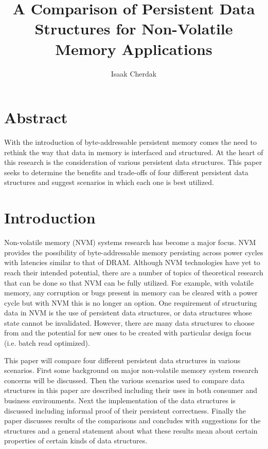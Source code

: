 \documentclass{article}
\title{A Comparison of Persistent Data Structures for Non-Volatile Memory
Applications}
\author{Isaak Cherdak}
\begin{document}
\maketitle

\section*{Abstract}

With the introduction of byte-addressable persistent memory comes the need to
rethink the way that data in memory is interfaced and structured. At the heart
of this research is the consideration of various persistent data structures.
This paper seeks to determine the benefits and trade-offs of four different
persistent data structures and suggest scenarios in which each one is best
utilized.

\pagebreak

\tableofcontents

\pagebreak


\section{Introduction}

Non-volatile memory (NVM) systems research has become a major focus. NVM
provides the possibility of byte-addressable memory persisting across power
cycles with latencies similar to that of DRAM. Although NVM technologies have
yet to reach their intended potential, there are a number of topics of
theoretical research that can be done so that NVM can be fully utilized. For
example, with volatile memory, any corruption or bugs present in memory can be
cleared with a power cycle but with NVM this is no longer an option. One
requirement of structuring data in NVM is the use of persistent data structures,
or data structures whose state cannot be invalidated. However, there are many
data structures to choose from and the potential for new ones to be created with
particular design focus (i.e. batch read optimized).

This paper will compare four different persistent data structures in various
scenarios. First some background on major non-volatile memory system research
concerns will be discussed. Then the various scenarios used to compare data
structures in this paper are described including their uses in both consumer and
business environments. Next the implementation of the data structures is
discussed including informal proof of their persistent correctness. Finally the
paper discusses results of the comparisons and concludes with suggestions for
the structures and a general statement about what these results mean about
certain properties of certain kinds of data structures.
\end{document}

